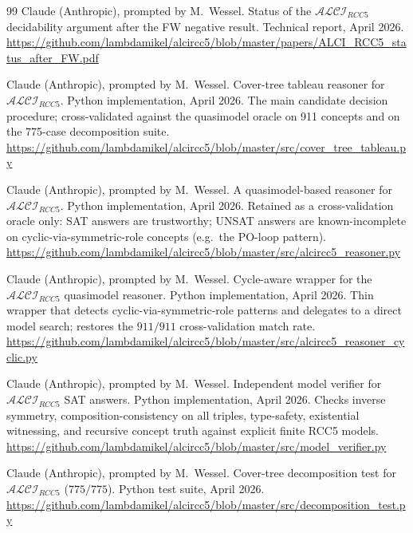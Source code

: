 \documentclass[
]{ceurart}
\theoremstyle{definition}
\newcommand{\ALCIRCC}[1]{\ensuremath{\mathcal{ALCI}_{\mathit{RCC#1}}}}
\begin{document}
\begin{thebibliography}{99}
Claude (Anthropic), prompted by M.\ Wessel.
\newblock Status of the $\ALCIRCC{5}$ decidability argument after
  the FW negative result.
\newblock Technical report, April 2026.
\newblock \url{https://github.com/lambdamikel/alcircc5/blob/master/papers/ALCI_RCC5_status_after_FW.pdf}


Claude (Anthropic), prompted by M.\ Wessel.
\newblock Cover-tree tableau reasoner for $\ALCIRCC{5}$.
\newblock Python implementation, April 2026.
\newblock The main candidate decision procedure; cross-validated
  against the quasimodel oracle on 911 concepts and on the 775-case
  decomposition suite.
\newblock \url{https://github.com/lambdamikel/alcircc5/blob/master/src/cover_tree_tableau.py}

Claude (Anthropic), prompted by M.\ Wessel.
\newblock A quasimodel-based reasoner for $\ALCIRCC{5}$.
\newblock Python implementation, April 2026.
\newblock Retained as a cross-validation oracle only: SAT answers
  are trustworthy; UNSAT answers are known-incomplete on
  cyclic-via-symmetric-role concepts (e.g.\ the PO-loop pattern).
\newblock \url{https://github.com/lambdamikel/alcircc5/blob/master/src/alcircc5_reasoner.py}

Claude (Anthropic), prompted by M.\ Wessel.
\newblock Cycle-aware wrapper for the $\ALCIRCC{5}$ quasimodel
  reasoner.
\newblock Python implementation, April 2026.
\newblock Thin wrapper that detects cyclic-via-symmetric-role
  patterns and delegates to a direct model search; restores the
  $911/911$ cross-validation match rate.
\newblock \url{https://github.com/lambdamikel/alcircc5/blob/master/src/alcircc5_reasoner_cyclic.py}

Claude (Anthropic), prompted by M.\ Wessel.
\newblock Independent model verifier for $\ALCIRCC{5}$ SAT answers.
\newblock Python implementation, April 2026.
\newblock Checks inverse symmetry, composition-consistency on all
  triples, type-safety, existential witnessing, and recursive
  concept truth against explicit finite RCC5 models.
\newblock \url{https://github.com/lambdamikel/alcircc5/blob/master/src/model_verifier.py}

Claude (Anthropic), prompted by M.\ Wessel.
\newblock Cover-tree decomposition test for $\ALCIRCC{5}$
  ($775/775$).
\newblock Python test suite, April 2026.
\newblock \url{https://github.com/lambdamikel/alcircc5/blob/master/src/decomposition_test.py}


\end{thebibliography}
\end{document}
